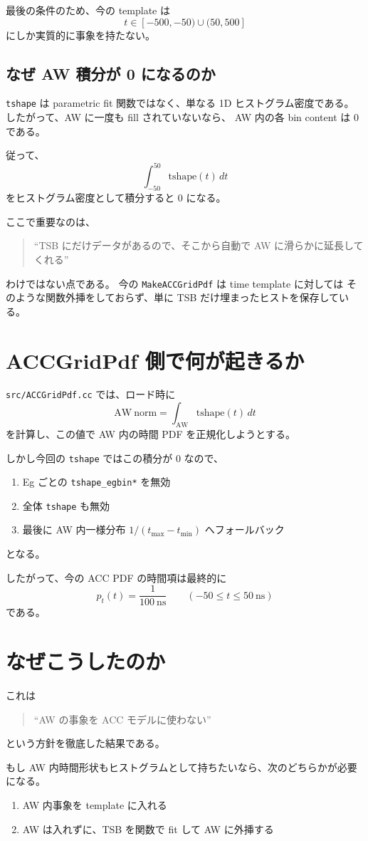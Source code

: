 \documentclass[a4paper,11pt]{jsarticle}
\begin{document}
最後の条件のため、今の template は
\[
t \in [-500,-50)\cup(50,500]
\]
にしか実質的に事象を持たない。

\subsection{なぜ AW 積分が 0 になるのか}
\texttt{tshape} は parametric fit 関数ではなく、単なる 1D ヒストグラム密度である。
したがって、AW に一度も fill されていないなら、
AW 内の各 bin content は 0 である。

従って、
\[
\int_{-50}^{50} \mathrm{tshape}(t)\,dt
\]
をヒストグラム密度として積分すると 0 になる。

ここで重要なのは、
\begin{quote}
``TSB にだけデータがあるので、そこから自動で AW に滑らかに延長してくれる''
\end{quote}
わけではない点である。
今の \texttt{MakeACCGridPdf} は time template に対しては
そのような関数外挿をしておらず、単に TSB だけ埋まったヒストを保存している。

\section{ACCGridPdf 側で何が起きるか}
\texttt{src/ACCGridPdf.cc} では、ロード時に
\[
\mathrm{AW\ norm}
=
\int_{\mathrm{AW}} \mathrm{tshape}(t)\,dt
\]
を計算し、この値で AW 内の時間 PDF を正規化しようとする。

しかし今回の \texttt{tshape} ではこの積分が 0 なので、
\begin{enumerate}
  \item Eg ごとの \texttt{tshape\_egbin*} を無効
  \item 全体 \texttt{tshape} も無効
  \item 最後に AW 内一様分布 \(1/(t_{\max}-t_{\min})\) へフォールバック
\end{enumerate}
となる。

したがって、今の ACC PDF の時間項は最終的に
\[
p_t(t)=\frac{1}{100\ \mathrm{ns}}
\qquad
(-50 \le t \le 50\ \mathrm{ns})
\]
である。

\section{なぜこうしたのか}
これは
\begin{quote}
``AW の事象を ACC モデルに使わない''
\end{quote}
という方針を徹底した結果である。

もし AW 内時間形状もヒストグラムとして持ちたいなら、次のどちらかが必要になる。
\begin{enumerate}
  \item AW 内事象を template に入れる
  \item AW は入れずに、TSB を関数で fit して AW に外挿する
\end{enumerate}
\end{document}
